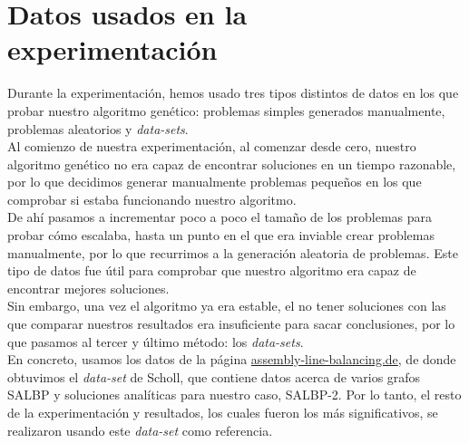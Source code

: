 \documentclass[12pt,a4paper]{report}
\begin{document}
\section{Datos usados en la experimentación}
\label{section:Datos}
Durante la experimentación, hemos usado tres tipos distintos de datos en los que probar nuestro algoritmo genético: problemas simples generados manualmente, problemas aleatorios y \textit{data-sets}.\\
Al comienzo de nuestra experimentación, al comenzar desde cero, nuestro algoritmo genético no era capaz de encontrar soluciones en un tiempo razonable, por lo que decidimos generar manualmente problemas pequeños en los que comprobar si estaba funcionando nuestro algoritmo.\\
De ahí pasamos a incrementar poco a poco el tamaño de los problemas para probar cómo escalaba, hasta un punto en el que era inviable crear problemas manualmente, por lo que recurrimos a la generación aleatoria de problemas. Este tipo de datos fue útil para comprobar que nuestro algoritmo era capaz de encontrar mejores soluciones.\\
Sin embargo, una vez el algoritmo ya era estable, el no tener soluciones con las que comparar nuestros resultados era insuficiente para sacar conclusiones, por lo que pasamos al tercer y último método: los \textit{data-sets}.\\
En concreto, usamos los datos de la página \textcolor{blue}{\href{https://assembly-line-balancing.de/salbp/benchmark-data-sets-1993/}{assembly-line-balancing.de}}, de donde obtuvimos el \textit{data-set} de Scholl, que contiene datos acerca de varios grafos SALBP y soluciones analíticas para nuestro caso, SALBP-2. Por lo tanto, el resto de la experimentación y resultados, los cuales fueron los más significativos, se realizaron usando este \textit{data-set} como referencia.
\newpage
\end{document}
